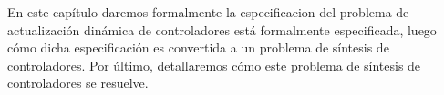 En este capítulo daremos formalmente la especificacion del problema de actualización dinámica de controladores está formalmente especificada,
luego cómo dicha especificación es convertida a un problema de síntesis de controladores. Por último, detallaremos cómo
este problema de síntesis de controladores se resuelve.

